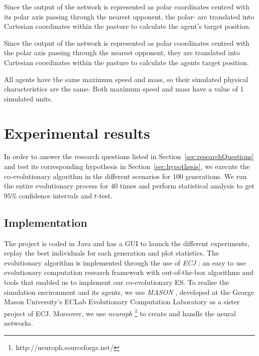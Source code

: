 \documentclass[conference]{IEEEtran}
\begin{document}

Since the output of the network is represented as polar coordinates centred with its polar axis passing through the nearest opponent, the polar- are translated into Cartesian coordinates within the pasture to calculate the agent's target position.

Since the output of the network is represented as polar coordinates centred with the polar axis passing through the nearest opponent, they are translated into Cartesian coordinates within the pasture to calculate the agents target position.


All agents have the same maximum speed and mass, so their simulated physical characteristics are the same.
Both maximum speed and mass have a value of $1$ simulated units.



\section{Experimental results}
\label{sec:experiment}
In order to answer the research questions listed in {Section~\ref{sec:researchQuestions}} and test its corresponding hypothesis in {Section~\ref{sec:hypothesis}}, we execute the co-evolutionary algorithm in the different scenarios for $100$ generations. 
We run the entire evolutionary process for $40$ times and perform statistical analysis to get $95\%$ confidence intervals and $t$-test.

\subsection{Implementation}
\label{sec:implementation}
The project is coded in Java and has a GUI to launch the different experiments, replay the best individuals for each generation and plot statistics.
The evolutionary algorithm is implemented through the use of \textit{ECJ} \cite{luke2006ecj}: an easy to use evolutionary computation research framework with out-of-the-box algorithms and tools that enabled us to implement our co-evolutionary ES.
To realise the simulation environment and its agents, we use \textit{MASON} \cite{luke2005mason}, developed at the George Mason University's ECLab Evolutionary Computation Laboratory as a sister project of ECJ.
Moreover, we use \textit{neuroph} \footnote{http://neuroph.sourceforge.net/} to create and handle the neural networks.
\end{document}
